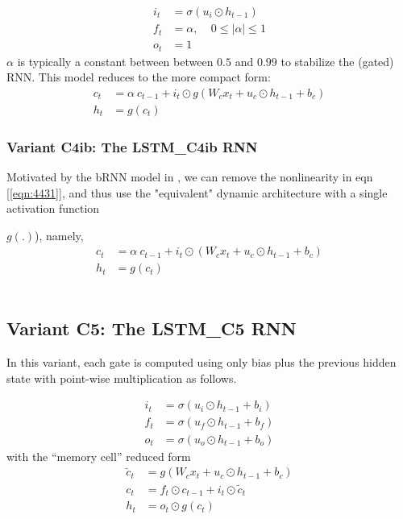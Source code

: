 \documentclass{article}
\begin{document}
{{{\begin{align}
	i_t &= \sigma(u_i \odot  h_{t-1} )\\
	f_t &= \alpha,  ~~~~~ 0 \leq  | \alpha | \leq  1 \\
	o_t &= 1
\end{align}
$\alpha$ is typically a constant between between $0.5$ and $0.99$ to stabilize the (gated) RNN.
This model reduces to the more compact form:
\begin{align}
	\label{eqn:CC31}	 c_t &=  \alpha ~ c_{t-1} + i_t \odot g(W_c x_t + u_c \odot  h_{t-1} + b_c)\\
	\label{eqn:CC41}	h_t &=  g(c_t)
\end{align}

\subsubsection{Variant C4ib: The LSTM\_C4ib RNN}

Motivated by the bRNN model in \cite {salem2016basic}, we can remove the nonlinearity in eqn [\ref{eqn:4431}], and thus use the "equivalent" dynamic architecture with a single activation function {$g(.)$), namely,
\begin{align}
	\label{eqn:CC431}	c_t &=  \alpha ~ c_{t-1} + i_t \odot (W_c x_t + u_c \odot  h_{t-1} + b_c)\\
	\label{eqn:CC441}	h_t &=  g(c_t)
\end{align}
\\

\subsection{Variant C5: The LSTM\_C5 RNN}
In this variant, each gate is computed using only bias plus the previous hidden state with point-wise multiplication as follows.

\begin{align}
	i_t &= \sigma(u_i \odot  h_{t-1} + b_i)\\
	f_t &= \sigma(u_f \odot h_{t-1} + b_f)\\
	o_t &= \sigma(u_o \odot  h_{t-1} + b_o)
\end{align}
with the ``memory cell'' reduced form
\begin{align}
	\label{eqn:C5C202}	\tilde{c}_t &= g(W_c x_t + u_c \odot  h_{t-1} + b_c)\\
	\label{eqn:C5C302}	 c_t &= f_t \odot c_{t-1} + i_t \odot \tilde{c}_t\\
	\label{eqn:C5C402}	h_t &= o_t \odot g(c_t)
\end{align}

}}}}
\end{document}
